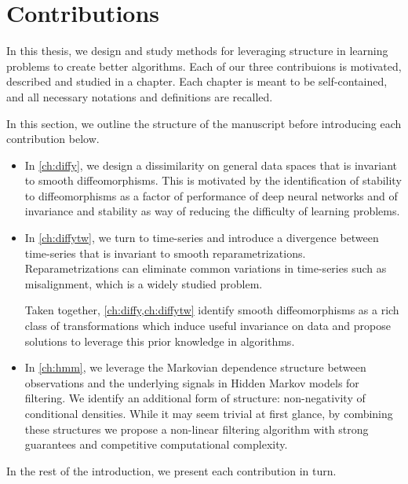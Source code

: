 \section{Contributions}

In this thesis, we design and study methods for leveraging structure in learning problems to create better algorithms.
Each of our three contribuions is motivated, described and studied in a chapter. Each chapter is meant to be self-contained, and all necessary notations and definitions are recalled.

In this section, we outline the structure of the manuscript before introducing each contribution below.

\begin{itemize}
\item In \cref{ch:diffy}, we design a dissimilarity on general data spaces that is invariant to smooth diffeomorphisms. This is motivated by the identification of stability to diffeomorphisms as a factor of performance of deep neural networks and of invariance and stability as way of reducing the difficulty of learning problems.

\item In \cref{ch:diffytw}, we turn to time-series and introduce a divergence between time-series that is invariant to smooth reparametrizations. Reparametrizations can eliminate common variations in time-series such as misalignment, which is a widely studied problem.

\medskip

Taken together, \cref{ch:diffy,ch:diffytw} identify smooth diffeomorphisms as a rich class of transformations which induce useful invariance on data and propose solutions to leverage this prior knowledge in algorithms.

\item  In \cref{ch:hmm}, we leverage the Markovian dependence structure between observations and the underlying signals in Hidden Markov models for filtering. We identify an additional form of structure: non-negativity of conditional densities. While it may seem trivial at first glance, by combining these structures we propose a non-linear filtering algorithm with strong guarantees and competitive computational complexity.
\end{itemize}

\noindent In the rest of the introduction, we present each contribution in turn.

